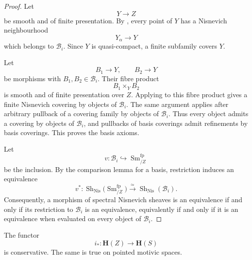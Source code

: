 \begin{proof}
Let
\[
    Y
    \longrightarrow
    Z
\]
be smooth and of finite presentation.  By
,
every point of \(Y\) has a Nisnevich neighbourhood
\[
    Y_\alpha
    \longrightarrow
    Y
\]
which belongs to \(\mathcal B_i\).  Since \(Y\) is quasi-compact, a
finite subfamily covers \(Y\).

Let
\[
    B_1
    \longrightarrow
    Y,
    \qquad
    B_2
    \longrightarrow
    Y
\]
be morphisms with \(B_1,B_2\in\mathcal B_i\).  Their fibre product
\[
    B_1\times_YB_2
\]
is smooth and of finite presentation over \(Z\).  Applying
 to this fibre product gives
a finite Nisnevich covering by objects of \(\mathcal B_i\).  The same
argument applies after arbitrary pullback of a covering family by
objects of \(\mathcal B_i\).  Thus every object admits a covering by
objects of \(\mathcal B_i\), and pullbacks of basis coverings admit
refinements by basis coverings.  This proves the basis axioms.

Let
\[
    v
    \colon
    \mathcal B_i
    \hookrightarrow
    \operatorname{Sm}^{\mathrm{fp}}_{/Z}
\]
be the inclusion.  By the comparison lemma for a basis, restriction
induces an equivalence
\[
    v^*
    \colon
    \operatorname{Sh}_{\mathrm{Nis}}
    \bigl(
        \operatorname{Sm}^{\mathrm{fp}}_{/Z}
    \bigr)
    \xrightarrow{\simeq}
    \operatorname{Sh}_{\mathrm{Nis}}(\mathcal B_i).
\]
Consequently, a morphism of spectral Nisnevich sheaves is an
equivalence if and only if its restriction to \(\mathcal B_i\) is an
equivalence, equivalently if and only if it is an equivalence when
evaluated on every object of \(\mathcal B_i\).
\end{proof}

\begin{lemma}
\label{lem:closed-direct-image-conservative}
The functor
\[
    i_*
    \colon
    \mathbf H(Z)
    \longrightarrow
    \mathbf H(S)
\]
is conservative.  The same is true on pointed motivic spaces.
\end{lemma}

